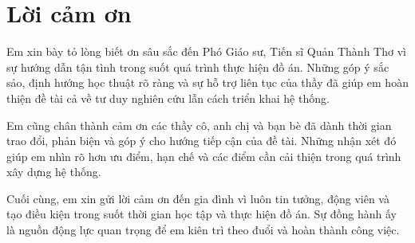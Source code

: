 \chapter*{Lời cảm ơn}

Em xin bày tỏ lòng biết ơn sâu sắc đến Phó Giáo sư, Tiến sĩ Quản Thành Thơ vì sự hướng dẫn tận tình trong suốt quá trình thực hiện đồ án. Những góp ý sắc sảo, định hướng học thuật rõ ràng và sự hỗ trợ liên tục của thầy đã giúp em hoàn thiện đề tài cả về tư duy nghiên cứu lẫn cách triển khai hệ thống.

Em cũng chân thành cảm ơn các thầy cô, anh chị và bạn bè đã dành thời gian trao đổi, phản biện và góp ý cho hướng tiếp cận của đề tài. Những nhận xét đó giúp em nhìn rõ hơn ưu điểm, hạn chế và các điểm cần cải thiện trong quá trình xây dựng hệ thống.

Cuối cùng, em xin gửi lời cảm ơn đến gia đình vì luôn tin tưởng, động viên và tạo điều kiện trong suốt thời gian học tập và thực hiện đồ án. Sự đồng hành ấy là nguồn động lực quan trọng để em kiên trì theo đuổi và hoàn thành công việc.

